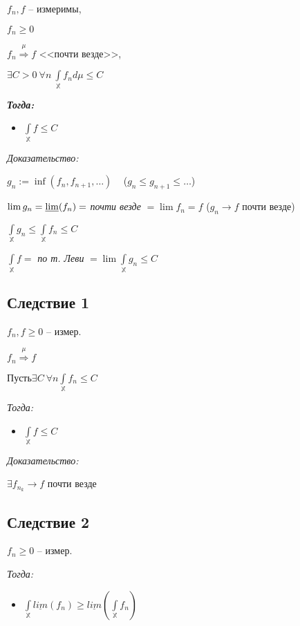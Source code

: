 \documentclass[paper=a4, fontsize=13.2pt]{article}
\begin{document}
$f_n, f$ -- измеримы,

$f_n \geq 0$

$f_n\stackrel{\mu}{\Rightarrow}f$ <<почти везде>>,

$\exists C > 0 ~ \forall n ~ \int\limits_{\mathbb{X}} f_n d\mu \leq C$

\textbf{\emph{Тогда:}}
\begin{itemize}
\item $\int\limits_{\mathbb{X}}f \leq C$
\end{itemize}

\emph{Доказательство:}

$ g_n := \inf(f_n, f_{n+1}, \dots ) $ ~ ($ g_n \leq g_{n+1} \leq \dots $)

$ \lim g_n = \varliminf(f_n) = $ \textit{почти везде} $ = \lim f_n  = f$ ($ g_n \rightarrow f $ почти везде)


$ \int\limits_{\mathbb{X}} g_n \leq \int\limits_{\mathbb{X}} f_n \leq C $

$ \int\limits_{\mathbb{X}} f = $ \textit{по т. Леви} $ = \lim \int\limits_{\mathbb{X}} g_n \leq C$

\subsection{Следствие 1}

$ f_n, f \geq 0$ -- измер.

$ f_n \stackrel{\mu}{\Rightarrow} f$

$ Пусть \exists C ~ \forall n  \int\limits_{\mathbb{X}} f_n \leq C $

\emph{Тогда:}
\begin{itemize}
	\item $ \int\limits_{\mathbb{X}}  f \leq C $
\end{itemize}

\emph{Доказательство:}

$ \exists f_{n_k} \rightarrow f $ почти везде

\subsection{Следствие 2}

$ f_n \geq 0 $ -- измер.

\emph{Тогда:}

\begin{itemize}
	\item $ \int\limits_{\mathbb{X}} \underline{lim}( f_n ) \geq \underline{lim}( \int\limits_{\mathbb{X}} f_n ) $
\end{itemize}
\end{document}
